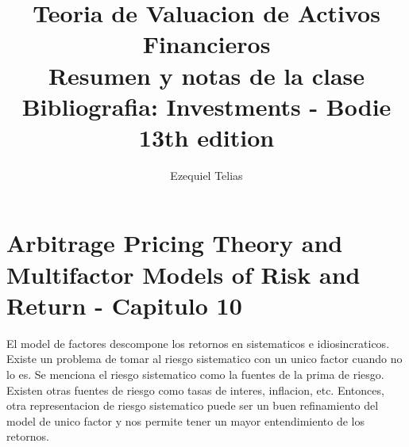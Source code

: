\documentclass{article}
\title{
    \textbf{Teoria de Valuacion de Activos Financieros} \\ 
    Resumen y notas de la clase
    \\
    \small Bibliografia: Investments - Bodie 13th edition
}
\author{Ezequiel Telias}
\date{}
\begin{document}
\maketitle

\section{Arbitrage Pricing Theory and Multifactor Models of Risk and Return - Capitulo 10}
El model de factores descompone los retornos en sistematicos e idiosincraticos. Existe un problema de tomar
al riesgo sistematico con un unico factor cuando no lo es. Se menciona el riesgo sistematico como la fuentes de
 la prima de riesgo. Existen otras fuentes de riesgo como tasas de interes, inflacion, etc. Entonces, otra representacion de 
 riesgo sistematico puede ser un buen refinamiento del model de unico factor y nos permite tener un mayor entendimiento de los retornos.
\end{document}
